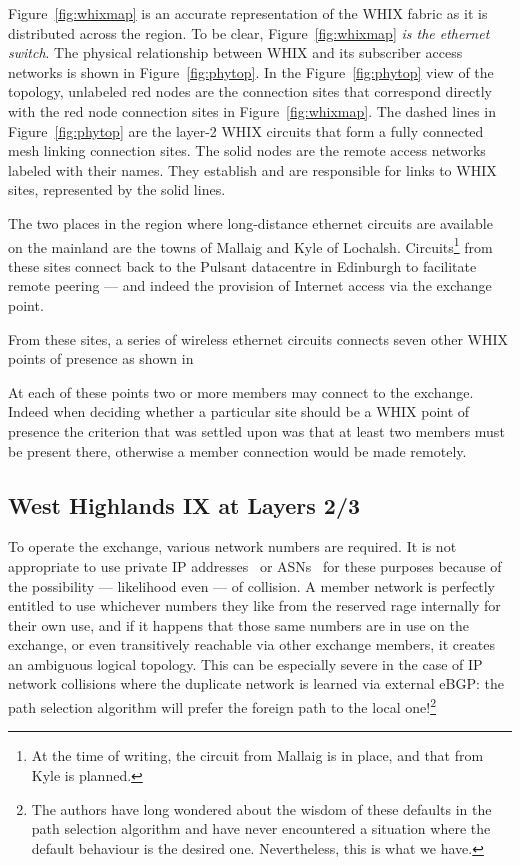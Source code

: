 Figure~\ref{fig:whixmap} is an accurate representation of the WHIX fabric as it
is distributed across the region. To be clear, Figure~\ref{fig:whixmap} \emph{is
the ethernet switch}. The physical relationship between WHIX and its subscriber
access networks is shown in Figure~\ref{fig:phytop}.
In the Figure~\ref{fig:phytop} view of the topology, unlabeled red nodes are the
connection sites that correspond directly with the red node connection sites in
Figure~\ref{fig:whixmap}. The dashed lines in Figure~\ref{fig:phytop} are the
layer-2 WHIX circuits that form a fully connected mesh linking connection sites.
The solid nodes are the remote access networks labeled with their names. They
establish and are responsible for links to WHIX sites, represented by the solid
lines.

The two places in the region where long-distance ethernet circuits are
available on the mainland are the towns of Mallaig and Kyle of
Lochalsh. Circuits\footnote{At the time of writing, the circuit from
Mallaig is in place, and that from Kyle is planned.} from these sites
connect back to the Pulsant datacentre in Edinburgh to facilitate
remote peering --- and indeed the provision of Internet access via the
exchange point.


From these sites, a series of wireless ethernet circuits connects
seven other \ac{WHIX} points of presence as shown in



At each of these points two or more members may connect to the
exchange. Indeed when deciding whether a particular site should be
a \ac{WHIX} point of presence the criterion that was settled upon was
that at least two members must be present there, otherwise a member
connection would be made remotely.




\subsection{West Highlands IX at Layers 2/3}

To operate the exchange, various network numbers are required. It is
not appropriate to use private IP addresses~\cite{rfc1918}
or \acp{ASN}~\cite{rfc6996} for these purposes because of the
possibility --- likelihood even --- of collision. A member network is
perfectly entitled to use whichever numbers they like from the
reserved rage internally for their own use, and if it happens that
those same numbers are in use on the exchange, or even transitively
reachable via other exchange members, it creates an ambiguous logical
topology. This can be especially severe in the case of IP network
collisions where the duplicate network is learned via external eBGP:
the path selection algorithm will prefer the foreign path to the local
one!\footnote{The authors have long wondered about the wisdom of these
defaults in the path selection algorithm and have never encountered a
situation where the default behaviour is the desired
one. Nevertheless, this is what we have.}

